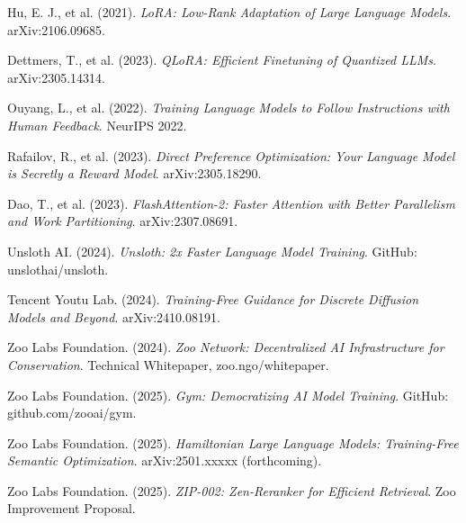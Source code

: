 \documentclass[twocolumn,11pt]{article}
\begin{document}
\begin{thebibliography}{99}
Hu, E. J., et al. (2021).
\textit{LoRA: Low-Rank Adaptation of Large Language Models}.
arXiv:2106.09685.

Dettmers, T., et al. (2023).
\textit{QLoRA: Efficient Finetuning of Quantized LLMs}.
arXiv:2305.14314.

Ouyang, L., et al. (2022).
\textit{Training Language Models to Follow Instructions with Human Feedback}.
NeurIPS 2022.

Rafailov, R., et al. (2023).
\textit{Direct Preference Optimization: Your Language Model is Secretly a Reward Model}.
arXiv:2305.18290.

Dao, T., et al. (2023).
\textit{FlashAttention-2: Faster Attention with Better Parallelism and Work Partitioning}.
arXiv:2307.08691.

Unsloth AI. (2024).
\textit{Unsloth: 2x Faster Language Model Training}.
GitHub: unslothai/unsloth.

Tencent Youtu Lab. (2024).
\textit{Training-Free Guidance for Discrete Diffusion Models and Beyond}.
arXiv:2410.08191.

Zoo Labs Foundation. (2024).
\textit{Zoo Network: Decentralized AI Infrastructure for Conservation}.
Technical Whitepaper, zoo.ngo/whitepaper.

Zoo Labs Foundation. (2025).
\textit{Gym: Democratizing AI Model Training}.
GitHub: github.com/zooai/gym.

Zoo Labs Foundation. (2025).
\textit{Hamiltonian Large Language Models: Training-Free Semantic Optimization}.
arXiv:2501.xxxxx (forthcoming).

Zoo Labs Foundation. (2025).
\textit{ZIP-002: Zen-Reranker for Efficient Retrieval}.
Zoo Improvement Proposal.

\end{thebibliography}
\end{document}
